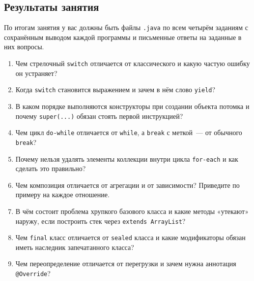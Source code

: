 \subsection*{Результаты занятия}

По итогам занятия у вас должны быть файлы \texttt{.java} по всем четырём
заданиям с сохранённым выводом каждой программы и письменные ответы на
заданные в них вопросы.

\kontrolvoprosy

\begin{enumerate}
\item Чем стрелочный \texttt{switch} отличается от классического и какую
      частую ошибку он устраняет?
\item Когда \texttt{switch} становится выражением и зачем в нём слово
      \texttt{yield}?
\item В каком порядке выполняются конструкторы при создании объекта потомка и
      почему \texttt{super(...)} обязан стоять первой инструкцией?
\item Чем цикл \texttt{do-while} отличается от \texttt{while}, а
      \texttt{break} с меткой~--- от обычного \texttt{break}?
\item Почему нельзя удалять элементы коллекции внутри цикла \texttt{for-each}
      и как сделать это правильно?
\item Чем композиция отличается от агрегации и от зависимости? Приведите по
      примеру на каждое отношение.
\item В чём состоит проблема хрупкого базового класса и какие методы «утекают»
      наружу, если построить стек через \texttt{extends ArrayList}?
\item Чем \texttt{final} класс отличается от \texttt{sealed} класса и какие
      модификаторы обязан иметь наследник запечатанного класса?
\item Чем переопределение отличается от перегрузки и зачем нужна аннотация
      \texttt{@Override}?
\end{enumerate}

\testzadaniya

